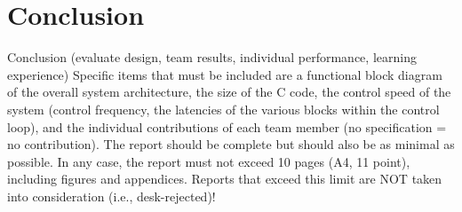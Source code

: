 \documentclass[final]{article}
\begin{document}
\section{Conclusion}
Conclusion (evaluate design, team results, individual performance, learning experience)
{ \color{red} Specific items that must be included are a functional block diagram of the overall system architecture, the size of the C code, the control speed of the system (control frequency, the latencies of the various blocks within the control loop), and the individual contributions of each team member (no specification = no contribution). The report should be complete but should also be as minimal as possible. In any case, the report must not exceed 10 pages (A4, 11 point), including figures and appendices. Reports that exceed this limit are NOT taken into consideration (i.e., desk-rejected)!}
\end{document}
